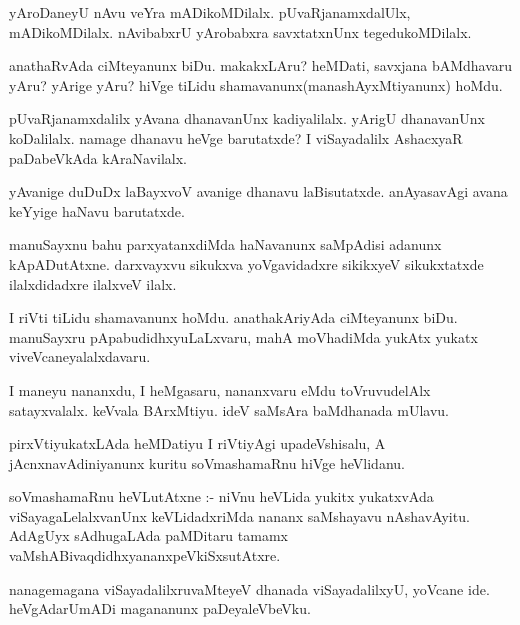 \documentclass{article}
\begin{document}
\begin{mn}
yAroDaneyU nAvu veYra mADikoMDilalx. pUvaRjanamxdalUlx, mADikoMDilalx. 
nAvibabxrU yArobabxra savxtatxnUnx tegedukoMDilalx.
\end{mn}

\begin{mn}
anathaRvAda ciMteyanunx  biDu. makakxLAru? heMDati, savxjana bAMdhavaru yAru? 
yArige yAru? hiVge tiLidu shamavanunx(manashAyxMtiyanunx) hoMdu. 
\end{mn}

\begin{mn}
pUvaRjanamxdalilx yAvana dhanavanUnx  kadiyalilalx. yArigU dhanavanUnx koDalilalx.
namage dhanavu heVge barutatxde? I viSayadalilx AshacxyaR paDabeVkAda kAraNavilalx.
\end{mn}

\begin{mn}
yAvanige duDuDx laBayxvoV avanige dhanavu laBisutatxde. anAyasavAgi avana 
keYyige haNavu barutatxde. 
\end{mn}

\begin{mn}
manuSayxnu bahu parxyatanxdiMda haNavanunx saMpAdisi adanunx kApADutAtxne. 
darxvayxvu sikukxva yoVgavidadxre sikikxyeV sikukxtatxde ilalxdidadxre ilalxveV ilalx.
\end{mn}

\begin{mn}
I riVti tiLidu shamavanunx hoMdu. anathakAriyAda ciMteyanunx biDu. manuSayxru 
pApabudidhxyuLaLxvaru, mahA moVhadiMda yukAtx yukatx viveVcaneyalalxdavaru. 
\end{mn}

\begin{mn}
I maneyu nananxdu, I heMgasaru, nananxvaru eMdu toVruvudelAlx satayxvalalx. 
keVvala BArxMtiyu. ideV saMsAra baMdhanada mUlavu. 
\end{mn}

\begin{mn}
pirxVtiyukatxLAda heMDatiyu I riVtiyAgi upadeVshisalu, A jAcnxnavAdiniyanunx
kuritu soVmashamaRnu hiVge heVlidanu.
\end{mn}

\begin{mn}
soVmashamaRnu heVLutAtxne :- niVnu heVLida yukitx yukatxvAda viSayagaLelalxvanUnx 
keVLidadxriMda  nananx saMshayavu nAshavAyitu. AdAgUyx sAdhugaLAda paMDitaru 
tamamx vaMshABivaqdidhxyananxpeVkiSxsutAtxre.
\end{mn}

\begin{mn}
nanagemagana viSayadalilxruvaMteyeV dhanada viSayadalilxyU, yoVcane ide.
 heVgAdarUmADi magananunx paDeyaleVbeVku.
\end{mn}
\end{document}
